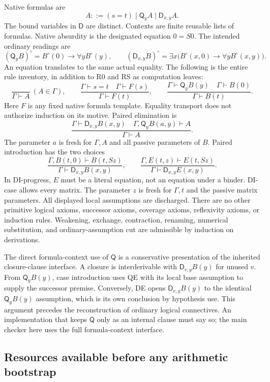 \documentclass[11pt,letterpaper]{article}
\theoremstyle{definition}\newtheorem{definition}[theorem]{Definition}
\theoremstyle{remark}\newtheorem{remark}[theorem]{Remark}
\newcommand{\D}{\mathsf D}
\newcommand{\Q}{\mathsf Q}
\begin{document}
Native formulas are
\[
            A::=(s=t)\mid\Q_y A\mid\D_{x,y}A.
\]
The bound variables in $\D$ are distinct. Contexts are finite reusable
lists of formulas. Native absurdity is the designated equation $0=S0$.
The intended ordinary readings are
\[
 (\Q_y B)^\circ=B^\circ(0)\to\forall yB^\circ(y),\qquad
 (\D_{x,y}B)^\circ=
 \exists x\bigl(B^\circ(x,0)\to\forall yB^\circ(x,y)\bigr).
\]
An equation translates to the same actual equality. The following is the
entire rule inventory, in addition to R0 and RS as computation leaves:
\[
 \frac{}{\Gamma\vdash A}\ (A\in\Gamma),\qquad
 \frac{\Gamma\vdash s=t\quad\Gamma\vdash F(s)}
      {\Gamma\vdash F(t)},\qquad
 \frac{\Gamma\vdash\Q_yB(y)\quad\Gamma\vdash B(0)}
      {\Gamma\vdash B(t)}.
 \tag{Hyp, Tr, QE}
\]
Here $F$ is any fixed native formula template. Equality transport does
not authorize induction on its motive. Paired elimination is
\[
 \frac{\Gamma\vdash\D_{x,y}B(x,y)\quad
       \Gamma,\Q_yB(a,y)\vdash A}{\Gamma\vdash A}.
 \tag{DE}
\]
The parameter $a$ is fresh for $\Gamma,A$ and all passive parameters of
$B$. Paired introduction has the two choices
\[
 \frac{\Gamma,B(t,0)\vdash B(t,Sz)}
      {\Gamma\vdash\D_{x,y}B(x,y)},\qquad
 \frac{\Gamma,E(t,z)\vdash E(t,Sz)}
      {\Gamma\vdash\D_{x,y}E(x,y)}.
 \tag{DI-case, DI-progress}
\]
In DI-progress, $E$ must be a literal equation, not an equation under a
binder. DI-case allows every matrix. The parameter $z$ is fresh for
$\Gamma,t$ and the passive matrix parameters. All displayed local
assumptions are discharged. There are no other primitive logical axioms,
successor axioms, coverage axioms, reflexivity axioms, or induction rules.
Weakening, exchange, contraction, renaming, numerical substitution, and
ordinary-assumption cut are admissible by induction on derivations.

The direct formula-context use of $\Q$ is a conservative presentation of
the inherited closure-clause interface. A closure is interderivable with
$\D_{v,y}B(y)$ for unused $v$. From $\Q_yB(y)$, case introduction
uses QE with its local base assumption to supply the successor premise.
Conversely, DE opens $\D_{v,y}B(y)$ to the identical $\Q_yB(y)$
assumption, which is its own conclusion by hypothesis use. This argument
precedes the reconstruction of ordinary logical connectives.
An implementation that keeps $\Q$ only as an internal clause
must say so; the main checker here uses the full formula-context interface.

\subsection{Resources available before any arithmetic bootstrap}
\end{document}
